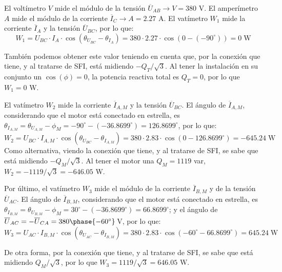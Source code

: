 El voltímetro $V$ mide el módulo de la tensión
$\overline{U}_{AB}\rightarrow V={380}$ {V}. El amperímetro $A$ mide el
módulo de la corriente $\overline{I}_C\rightarrow A={2.27}$ {A}. El
vatímetro $W_1$ mide la corriente $\overline{I}_A$ y la tensión
$\overline{U}_{BC}$, por lo que:
\begin{equation*}
  W_1=U_{BC}\cdot I_A\cdot \cos{(\theta_{{U}_{BC}}-\theta_{{I}_A})}= 380\cdot 2.27\cdot \cos(0-(-90^\circ))={0\;\text{W}}
\end{equation*}

También podemos obtener este valor teniendo en cuenta que, por la
conexión que tiene, y al tratarse de SFI, está midiendo
$-Q_T/\sqrt{3}$. Al tener la instalación en su conjunto un
$\cos(\phi)=0$, la potencia reactiva total es $Q_T=0$, por lo que
$W_1=0$ W.

\vspace{3mm}
El vatímetro $W_2$ mide la corriente $\overline{I}_{A,M}$ y la tensión
$\overline{U}_{BC}$. El ángulo de $\overline{I}_{A,M}$, considerando
que el motor está conectado en estrella, es
$\theta_{{I}_{A,M}}=\theta_{{U}_{A,M}}-\phi_M=-90^\circ-(-36.8699^\circ)=126.8699^\circ$,
por lo que:
\begin{equation*}
  W_2=U_{BC}\cdot I_{A,M}\cdot \cos{(\theta_{{U}_{BC}}-\theta_{{I}_{A,M}})}= 380\cdot 2.83\cdot \cos(0-126.8699^\circ)={-645.24\;\text{W}}
\end{equation*}
Como alternativa, viendo la conexión que tiene, y al tratarse de SFI,
se sabe que está midiendo $-Q_M/\sqrt{3}$. Al tener el motor una
$Q_M=1119$ var, $W_2=-1119/\sqrt{3}=-646.05$ W.

  \vspace{3mm}
Por último, el vatímetro $W_3$ mide el módulo de la corriente
$\overline{I}_{B,M}$ y de la tensión $\overline{U}_{AC}$. El ángulo de
$\overline{I}_{B,M}$, considerando que el motor está conectado en
estrella, es
$\theta_{I_{B,M}}=\theta_{U_{B,M}}-\phi_M=30^\circ-(-36.8699^\circ)=66.8699^\circ$;
y el ángulo de
$\overline{U}_{AC}=-\overline{U}_{CA}=380\phase{-60^\circ}$\,\si{\volt}, por lo
que:
\begin{equation*}
  W_3=U_{AC}\cdot I_{B,M}\cdot \cos{(\theta_{{U}_{AC}}-\theta_{{I}_{B,M}})}= 380\cdot 2.83\cdot \cos(-60^\circ-66.8699^\circ)={645.24\;\text{W}}
\end{equation*}

De otra forma, por la conexión que tiene, y al tratarse de SFI, se
sabe que está midiendo $Q_M/\sqrt{3}$, por lo que
$W_3=1119/\sqrt{3}=646.05$ W.



